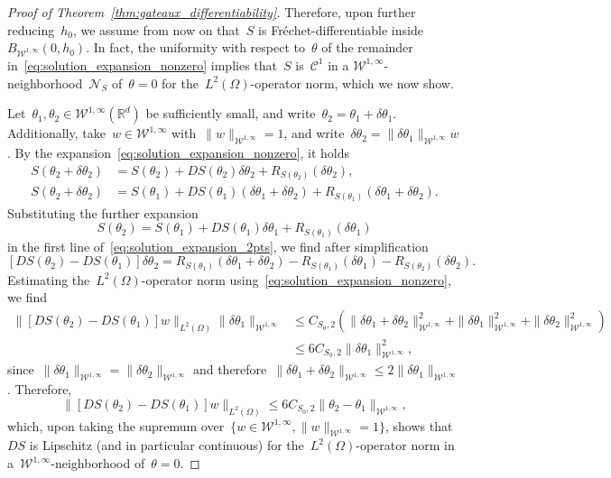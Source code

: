 \documentclass[a4]{article}
\newcommand{\R}{\mathbb{R}}
\newcommand{\1}{\mathbbm 1}
\newcommand{\Winf}{{{\cW}^{1,\infty}}}
\newcommand{\cW}{\mathcal{W}}
\begin{document}
\begin{proof}[Proof of Theorem~\ref{thm:gateaux_differentiability}]
    Therefore, upon further reducing~$h_0$, we assume from now on that~$S$ is Fréchet-differentiable inside~$B_{\Winf}(0,h_0)$.
    In fact, the uniformity with respect to~$\theta$ of the remainder in~\eqref{eq:solution_expansion_nonzero} implies that~$S$ is~$\mathcal C^1$ in a $\Winf$-neighborhood~$\mathcal N_S$ of~$\theta=0$ for the~$L^2(\Omega)$-operator norm, which we now show.

    Let~$\theta_1,\theta_2\in\Winf(\R^d)$ be sufficiently small, and write~$\theta_2 = \theta_1 + \delta\theta_1$. Additionally, take~$w\in \Winf$ with~$\|w\|_{\Winf}=1$, and write~$\delta\theta_2 = \|\delta\theta_1\|_{\Winf}w$.
    By the expansion~\eqref{eq:solution_expansion_nonzero}, it holds
    \begin{equation}
        \label{eq:solution_expansion_2pts}
        \begin{aligned}
            S(\theta_2+\delta\theta_2) &= S(\theta_2) + DS(\theta_2)\delta\theta_2 + R_{S(\theta_2)}(\delta\theta_2),\\
            S(\theta_2+\delta\theta_2) &= S(\theta_1) + DS(\theta_1)(\delta\theta_1+\delta\theta_2) + R_{S(\theta_1)}(\delta\theta_1+\delta\theta_2).
        \end{aligned}
    \end{equation}
    Substituting the further expansion
    \begin{equation}
        S(\theta_2)=S(\theta_1)+DS(\theta_1)\delta\theta_1 + R_{S(\theta_1)}(\delta\theta_1)
    \end{equation}
    in the first line of~\eqref{eq:solution_expansion_2pts}, we find after simplification
    \begin{equation}
    \left[DS(\theta_2)-DS(\theta_1)\right]\delta\theta_2 = R_{S(\theta_1)}(\delta\theta_1+\delta\theta_2)-R_{S(\theta_1)}(\delta\theta_1)-R_{S(\theta_2)}(\delta\theta_2).
    \end{equation}
    Estimating the~$L^2(\Omega)$-operator norm using~\eqref{eq:solution_expansion_nonzero}, we find
    \begin{equation}
        \begin{aligned}
            \|\left[DS(\theta_2)-DS(\theta_1)\right]w\|_{L^2(\Omega)}\|\delta\theta_1\|_{\Winf} &\leq C_{S_0,2}\left(\|\delta\theta_1+\delta\theta_2\|_{\Winf}^2+\|\delta\theta_1\|_{\Winf}^2+\|\delta\theta_2\|_{\Winf}^2\right)\\
        &\leq 6C_{S_0,2}\|\delta\theta_1\|_{\Winf}^2,
        \end{aligned}
    \end{equation}
    since~$\|\delta\theta_1\|_{\Winf}=\|\delta\theta_2\|_{\Winf}$ and therefore~$\|\delta\theta_1+\delta\theta_2\|_{\Winf}\leq 2\|\delta\theta_1\|_{\Winf}$. Therefore,
    \begin{equation}
        \|[DS(\theta_2)-DS(\theta_1)]w\|_{L^2(\Omega)} \leq 6C_{S_0,2}\|\theta_2-\theta_1\|_{\Winf},
    \end{equation}
    which, upon taking the supremum over~$\{w\in\Winf,\|w\|_{\Winf}=1\}$, shows that~$DS$ is Lipschitz (and in particular continuous) for the~$L^2(\Omega)$-operator norm in a~$\Winf$-neighborhood of~$\theta=0$.


\end{proof}
\end{document}
